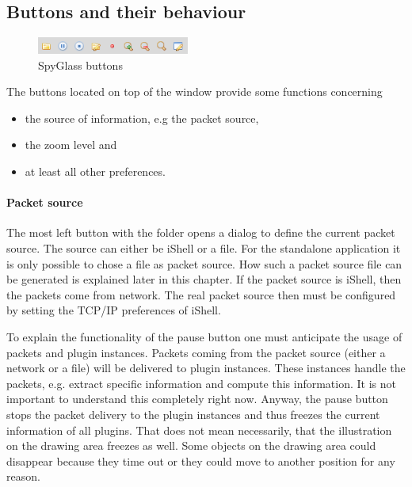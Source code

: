 \subsection{Buttons and their behaviour}

\begin{figure}[htb]
  \begin{center}
    \includegraphics[width=5cm]{./pics/spyglass_buttons}
    \caption{SpyGlass buttons}
    \label{pic:spyglass_buttons}
  \end{center}
\end{figure}

The buttons located on top of the window provide some functions concerning
\begin{itemize}
  \item{the source of information, e.g the packet source,}
  \item{the zoom level and}
  \item{at least all other preferences}.
\end{itemize}

\paragraph{Packet source}

The most left button with the folder opens a dialog to define the current packet source. The source can either be iShell or
a file. For the standalone application it is only possible to chose a file as packet source. How such a packet source file
can be generated is explained later in this chapter. If the packet source is iShell, then the packets come from network.
The real packet source then must be configured by setting the TCP/IP preferences of iShell.

To explain the functionality of the pause button one must anticipate the usage of packets and plugin instances. Packets
coming from the packet source (either a network or a file) will be delivered to plugin instances. These instances
handle the packets, e.g. extract specific information and compute this information. It is not important to understand
this completely right now. Anyway, the pause button stops the packet delivery to the plugin instances and thus
freezes the current information of all plugins. That does not mean necessarily, that the illustration on the drawing area
freezes as well. Some objects on the drawing area could disappear because they time out or they could move to another
position for any reason.

